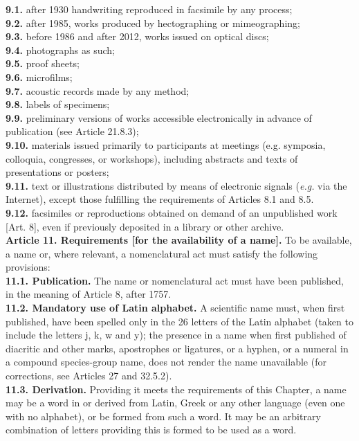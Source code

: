 \documentclass[letterpaper, 11pt]{article}
\begin{document}
\noindent{}\textbf{9.1.} after 1930 handwriting reproduced in facsimile by any process;\\
\noindent{}\textbf{9.2.} after 1985, works produced by hectographing or mimeographing;\\
\noindent{}\textbf{9.3.} before 1986 and after 2012, works issued on optical discs;\\
\noindent{}\textbf{9.4.} photographs as such;\\
\noindent{}\textbf{9.5.} proof sheets;\\
\noindent{}\textbf{9.6.} microfilms;\\
\noindent{}\textbf{9.7.} acoustic records made by any method;\\
\noindent{}\textbf{9.8.} labels of specimens;\\
\noindent{}\textbf{9.9.} preliminary versions of works accessible electronically in advance of publication (see Article 21.8.3);\\
\noindent{}\textbf{9.10.} materials issued primarily to participants at meetings (e.g. symposia, colloquia, congresses, or workshops), including abstracts and texts of presentations or posters;\\
\noindent{}\textbf{9.11.} text or illustrations distributed by means of electronic signals (\textit{e.g.} via the Internet), except those fulfilling the requirements of Articles 8.1 and 8.5.\\
\noindent{}\textbf{9.12.} facsimiles or reproductions obtained on demand of an unpublished work [Art. 8], even if previously deposited in a library or other archive.\\

\noindent{}\textbf{Article 11. Requirements [for the availability of a name].} To be available, a name or, where relevant, a nomenclatural act must satisfy the following provisions:\\
\noindent{}\textbf{11.1. Publication.} The name or nomenclatural act must have been published, in the meaning of Article 8, after 1757.\\
\noindent{}\textbf{11.2. Mandatory use of Latin alphabet.} A scientific name must, when first published, have been spelled only in the 26 letters of the Latin alphabet (taken to include the letters j, k, w and y); the presence in a name when first published of diacritic and other marks, apostrophes or ligatures, or a hyphen, or a numeral in a compound species-group name, does not render the name unavailable (for corrections, see Articles 27 and 32.5.2).\\
\noindent{}\textbf{11.3. Derivation.} Providing it meets the requirements of this Chapter, a name may be a word in or derived from Latin, Greek or any other language (even one with no alphabet), or be formed from such a word. It may be an arbitrary combination of letters providing this is formed to be used as a word.\\
\end{document}
